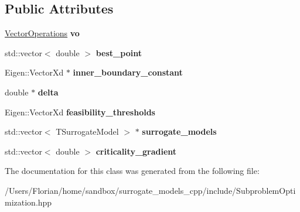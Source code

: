\subsection*{Public Attributes}
\begin{DoxyCompactItemize}
\item 
\hyperlink{class_vector_operations}{Vector\+Operations} {\bfseries vo}\hypertarget{class_subproblem_optimization_a5145274dc476bb65af85fb876ad86dd9}{}\label{class_subproblem_optimization_a5145274dc476bb65af85fb876ad86dd9}

\item 
std\+::vector$<$ double $>$ {\bfseries best\+\_\+point}\hypertarget{class_subproblem_optimization_a543c8a10203c0917a436ed50006c39a4}{}\label{class_subproblem_optimization_a543c8a10203c0917a436ed50006c39a4}

\item 
Eigen\+::\+Vector\+Xd $\ast$ {\bfseries inner\+\_\+boundary\+\_\+constant}\hypertarget{class_subproblem_optimization_aec026c86fbb9c5c7f7ef81595ebd86e5}{}\label{class_subproblem_optimization_aec026c86fbb9c5c7f7ef81595ebd86e5}

\item 
double $\ast$ {\bfseries delta}\hypertarget{class_subproblem_optimization_aa96e41c23af55c81abbd2d264dd2306f}{}\label{class_subproblem_optimization_aa96e41c23af55c81abbd2d264dd2306f}

\item 
Eigen\+::\+Vector\+Xd {\bfseries feasibility\+\_\+thresholds}\hypertarget{class_subproblem_optimization_a424f7351b8bd9daee815e99c5230bdd6}{}\label{class_subproblem_optimization_a424f7351b8bd9daee815e99c5230bdd6}

\item 
std\+::vector$<$ T\+Surrogate\+Model $>$ $\ast$ {\bfseries surrogate\+\_\+models}\hypertarget{class_subproblem_optimization_ac6628ed84249758be3fd92d754030c36}{}\label{class_subproblem_optimization_ac6628ed84249758be3fd92d754030c36}

\item 
std\+::vector$<$ double $>$ {\bfseries criticality\+\_\+gradient}\hypertarget{class_subproblem_optimization_ab8757dae15858cce810a4f251d3b19a4}{}\label{class_subproblem_optimization_ab8757dae15858cce810a4f251d3b19a4}

\end{DoxyCompactItemize}


The documentation for this class was generated from the following file\+:\begin{DoxyCompactItemize}
\item 
/\+Users/\+Florian/home/sandbox/surrogate\+\_\+models\+\_\+cpp/include/Subproblem\+Optimization.\+hpp\end{DoxyCompactItemize}
